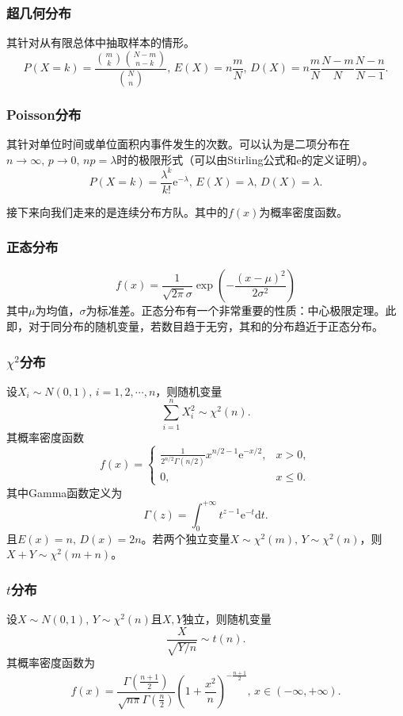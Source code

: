 \documentclass[a4paper, 12pt]{article}
\begin{document}
    \subsubsection{超几何分布}
    其针对从有限总体中抽取样本的情形。
    \[
    P(X=k)=\frac{\binom{m}{k}\binom{N-m}{n-k}}{\binom{N}{n}},\,E(X)=n\frac{m}{N},\,D(X)=n\frac{m}{N}\frac{N-m}{N}\frac{N-n}{N-1}.
    \]

    \subsubsection{Poisson分布}
    其针对单位时间或单位面积内事件发生的次数。可以认为是二项分布在$n\to\infty,\,p\to 0,\,np=\lambda$时的极限形式（可以由Stirling公式和e的定义证明）。
    \[
    P(X=k)=\frac{\lambda^k}{k!}\mathrm e^{-\lambda},\,E(X)=\lambda,\,D(X)=\lambda.
    \]

    接下来向我们走来的是连续分布方队。其中的$f(x)$为概率密度函数。

    \subsubsection{正态分布}
    \[
    f(x)=\frac{1}{\sqrt{2\pi}\sigma}\exp\left(-\frac{(x-\mu)^2}{2\sigma^2}\right)
    \]
    其中$\mu$为均值，$\sigma$为标准差。正态分布有一个非常重要的性质：中心极限定理。此即，对于同分布的随机变量，若数目趋于无穷，其和的分布趋近于正态分布。

    \subsubsection{$\chi^2$分布}
    设$X_i\sim N(0,1),\,i=1,2,\cdots,n$，则随机变量
    \[
    \sum_{i=1}^n X_i^2\sim\chi^2(n).
    \]
    其概率密度函数
    \[
    f(x)=\begin{cases}
        \frac{1}{2^{n/2}\Gamma(n/2)}x^{n/2-1}\mathrm e^{-x/2}, & x>0, \\
        0, & x\leq 0.
    \end{cases}
    \]
    其中Gamma函数定义为
    \[
    \Gamma(z)=\int_0^{+\infty}t^{z-1}\mathrm e^{-t}\mathrm dt.
    \]
    且$E(x)=n,\,D(x)=2n$。若两个独立变量$X\sim\chi^2(m),\,Y\sim\chi^2(n)$，则$X+Y\sim\chi^2(m+n)$。

    \subsubsection{$t$分布}
    设$X\sim N(0,1),\,Y\sim\chi^2(n)$且$X,Y$独立，则随机变量
    \[
    \frac{X}{\sqrt{Y/n}}\sim t(n).
    \]
    其概率密度函数为
    \[
    f(x)=\frac{\Gamma\left(\frac{n+1}{2}\right)}{\sqrt{n\pi}\Gamma\left(\frac{n}{2}\right)}\left(1+\frac{x^2}{n}\right)^{-\frac{n+1}{2}},\,x\in(-\infty,+\infty).
    \]
\end{document}
